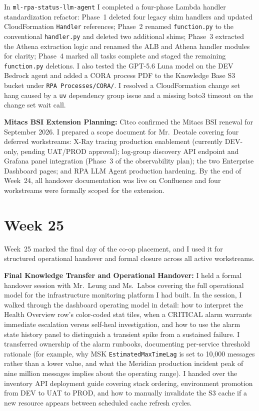 In \texttt{ml-rpa-status-llm-agent} I completed a four-phase Lambda handler standardization refactor: Phase~1 deleted four legacy shim handlers and updated CloudFormation \texttt{Handler} references; Phase~2 renamed \texttt{function.py} to the conventional \texttt{handler.py} and deleted two additional shims; Phase~3 extracted the Athena extraction logic and renamed the ALB and Athena handler modules for clarity; Phase~4 marked all tasks complete and staged the remaining \texttt{function.py} deletions. I also tested the GPT-5.6 Luna model on the DEV Bedrock agent and added a CORA process PDF to the Knowledge Base S3 bucket under \texttt{RPA Processes/CORA/}. I resolved a CloudFormation change set hang caused by a \texttt{uv} dependency group issue and a missing boto3 timeout on the change set wait call.

\textbf{Mitacs BSI Extension Planning:} 
Citco confirmed the Mitacs BSI renewal for September 2026. I prepared a scope document for Mr.\ Deotale covering four deferred workstreams: X-Ray tracing production enablement (currently DEV-only, pending UAT/PROD approval); log-group discovery API endpoint and Grafana panel integration (Phase~3 of the observability plan); the two Enterprise Dashboard pages; and RPA LLM Agent production hardening. By the end of Week~24, all handover documentation was live on Confluence and four workstreams were formally scoped for the extension.


\FloatBarrier

\section{Week 25}
\label{sec:week25}

Week~25 marked the final day of the co-op placement, and I used it for structured operational handover and formal closure across all active workstreams.

\textbf{Final Knowledge Transfer and Operational Handover:} 
I held a formal handover session with Mr.\ Leung and Ms.\ Labos covering the full operational model for the infrastructure monitoring platform I had built. In the session, I walked through the dashboard operating model in detail: how to interpret the Health Overview row's color-coded stat tiles, when a CRITICAL alarm warrants immediate escalation versus self-heal investigation, and how to use the alarm state history panel to distinguish a transient spike from a sustained failure. I transferred ownership of the alarm runbooks, documenting per-service threshold rationale (for example, why MSK \texttt{EstimatedMaxTimeLag} is set to 10,000 messages rather than a lower value, and what the Meridian production incident peak of nine million messages implies about the operating range). I handed over the inventory API deployment guide covering stack ordering, environment promotion from DEV to UAT to PROD, and how to manually invalidate the S3 cache if a new resource appears between scheduled cache refresh cycles.

